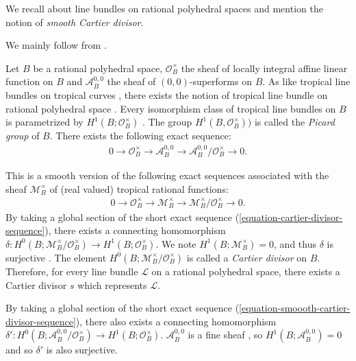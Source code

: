 \documentclass[a4paper,dvipdfmx,reqno,12pt]{amsart}
\theoremstyle{definition}
\newcommand{\mcal}[1]{\mathcal{#1}}%
\numberwithin{equation}{section}
\begin{document}
We recall about line bundles on 
rational polyhedral spaces and mention the notion of
\emph{smooth Cartier divisor}.

We mainly follow 
from \cite{MR3903579,gross2019sheaftheoretic}.


Let $B$ be a rational polyhedral space, 
$\mathcal{O}^{\times}_B$ the sheaf of 
locally integral affine linear function on $B$
and $\mathcal{A}^{0,0}_B$ the sheaf of 
$(0,0)$-superforms on $B$. 
As like tropical line bundles on tropical curves
\cite[Definition 4.4]{mikhalkinTropicalCurvesTheir2008a},
there exists the notion of tropical line bundle on 
rational polyhedral space
\cite[Definition 3.12]{gross2019sheaftheoretic}.
Every isomorphism class of 
tropical line bundles on $B$ is parametrized by 
$H^{1}(B;\mathcal{O}^{\times}_B)$
\cite[Proposition 3.13]{gross2019sheaftheoretic}.
The group $H^{1}(B, \mcal{O}^{\times}_B))$ is called 
the \emph{Picard group} of $B$.
There exists the following exact sequence:
\begin{align}
\label{equation-smoooth-cartier-divisor-sequence}
0\to \mathcal{O}^{\times}_B \to
\mathcal{A}^{0,0}_{B} \to
\mathcal{A}^{0,0}_{B}/\mathcal{O}^{\times}_B\to 0.
\end{align}

This is a smooth version of the following exact
sequences associated with the sheaf 
$\mcal{M}_B^{\times}$
of (real valued) tropical rational functions:
\begin{align}
\label{equation-cartier-divisor-sequence}
0 \to \mcal{O}^{\times}_B \to \mcal{M}_B^{\times} 
\to \mcal{M}_B^{\times}/\mathcal{O}^{\times}_B\to 0.
\end{align}
By taking a global section of the
short exact sequence 
(\ref{equation-cartier-divisor-sequence}),
there exists a connecting homomorphism 
$\delta \colon 
H^{0}(B;\mcal{M}_B^{\times}/\mathcal{O}^{\times}_B)
\to H^{1}(B;\mathcal{O}^{\times}_B)$.
We note $H^{1}(B;\mcal{M}_{B}^{\times})=0$, 
and thus $\delta$ is surjective
\cite[Lemma 4.5, Proposition 4.6]{MR3894860}.
The element $H^{0}(B;\mcal{M}_B^{\times}/\mathcal{O}^{\times}_B)$
is called a \emph{Cartier divisor} on $B$.
Therefore, for every line bundle $\mathcal{L}$ on a rational polyhedral 
space, there exists a Cartier divisor $s$ 
which represents $\mathcal{L}$.

By taking a global section of the
short exact sequence
(\ref{equation-smoooth-cartier-divisor-sequence}),
there also exists a connecting homomorphism 
$\delta' \colon 
H^{0}(B;\mathcal{A}^{0,0}_{B}/\mathcal{O}^{\times}_B)
\to H^{1}(B;\mathcal{O}^{\times}_B)$. 
$\mathcal{A}^{0,0}_B$ is a fine sheaf 
\cite[Proposition 2.26]{MR3903579}, so 
$H^{1}(B;\mathcal{A}^{0,0}_B)=0$ and 
so $\delta'$ is also surjective.
\end{document}
